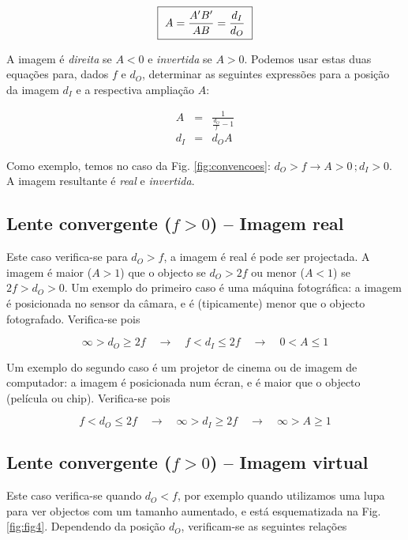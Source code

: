 \documentclass[a4paper,12pt]{article}      %
\begin{document}
 \begin{equation}
    \fbox{
        $ \displaystyle
A =  \frac{A'B'}{ AB} =\frac{d_I}{d_O}
$
}
\end{equation}
 
A imagem é \emph{direita} se $A<0$ e \emph{invertida} se $A>0$. Podemos usar estas duas equações para, dados $f$ e $d_O$, determinar as seguintes expressões para a posição da imagem $d_I$ e a respectiva ampliação $A$:
 
\begin{eqnarray}
A&=&\frac{1}{\frac{d_O}{f}-1}\\
d_I&=&d_OA
\end{eqnarray}

 
Como exemplo, temos no caso da Fig. \ref{fig:convencoes}: $d_O>f \to A> 0\,; d_I > 0$. A imagem resultante é \emph{real} e \emph{invertida}.

\subsection{\sf Lente convergente ($f>0$) -- Imagem real}
Este caso verifica-se para $d_O>f$, a imagem é real é pode ser projectada. A imagem é maior ($A>1$) que o objecto se $d_O>2f$ ou menor ($A<1$) se $2f>d_O>0$. Um exemplo do primeiro caso é uma máquina fotográfica: a imagem é posicionada no sensor da câmara, e é (tipicamente) menor que o objecto fotografado. Verifica-se   pois

\begin{equation}
\infty > d_O \ge 2 f \quad \to \quad f < d_I \le 2 f  \quad \to \quad 0<A\le 1
\end{equation}

Um exemplo do segundo caso é um projetor de cinema ou de imagem de computador: a imagem é posicionada num écran, e é maior que o objecto (película ou chip). Verifica-se   pois

\begin{equation}
f < d_O \le 2 f  \quad \to  \quad  \infty > d_I \ge 2f \quad \to \quad \infty>A\ge 1
\end{equation}

\subsection{\sf Lente convergente ($f>0$) -- Imagem virtual}

Este caso verifica-se quando $d_O<f$, por exemplo quando utilizamos uma lupa para ver objectos com um tamanho aumentado, e está esquematizada na Fig. \ref{fig:fig4}. Dependendo da posição $d_O$, verificam-se as seguintes relações
\end{document}
